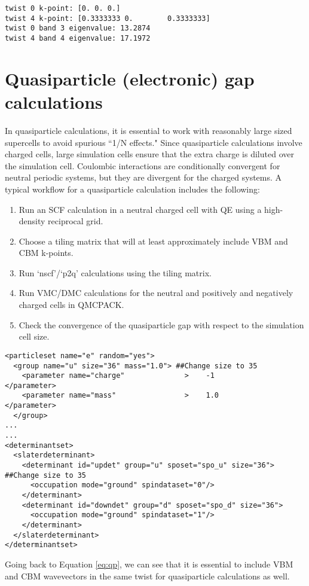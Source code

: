 \begin{lstlisting}[style=Python]
twist 0 k-point: [0. 0. 0.]
twist 4 k-point: [0.3333333 0.        0.3333333]
twist 0 band 3 eigenvalue: 13.2874
twist 4 band 4 eigenvalue: 17.1972
\end{lstlisting}

\section{Quasiparticle (electronic) gap calculations}\label{sec:lab_ex_qp}
In quasiparticle calculations, it is essential to work with reasonably large sized supercells to avoid spurious ``1/N effects." 
Since quasiparticle calculations involve charged cells, large simulation cells ensure that the extra charge is diluted over the simulation cell. Coulombic interactions are conditionally convergent for neutral periodic systems, but they are divergent for the charged systems. 
A typical workflow for a quasiparticle calculation includes the following:
\begin{enumerate}
	\item Run an SCF calculation in a neutral charged cell with QE using a high-density reciprocal grid.
	\item Choose a tiling matrix that will at least approximately include VBM and CBM k-points. 
	\item Run `nscf'/`p2q' calculations using the tiling matrix. 
	\item Run VMC/DMC calculations for the neutral and positively and negatively charged cells in QMCPACK.
	\item Check the convergence of the quasiparticle gap with respect to the simulation cell size.
\end{enumerate}
\begin{lstlisting}[style=QMCPXML]
<particleset name="e" random="yes">
  <group name="u" size="36" mass="1.0"> ##Change size to 35
    <parameter name="charge"              >    -1                    </parameter>
    <parameter name="mass"                >    1.0                   </parameter>
  </group>
...
...
<determinantset>
  <slaterdeterminant>
    <determinant id="updet" group="u" sposet="spo_u" size="36"> ##Change size to 35
      <occupation mode="ground" spindataset="0"/>	
    </determinant>
    <determinant id="downdet" group="d" sposet="spo_d" size="36">
      <occupation mode="ground" spindataset="1"/>	
    </determinant>
  </slaterdeterminant>
</determinantset>
\end{lstlisting}
Going back to Equation \ref{eq:qp}, we can see that it is essential to include VBM and CBM wavevectors in the same twist for quasiparticle calculations as well. 
